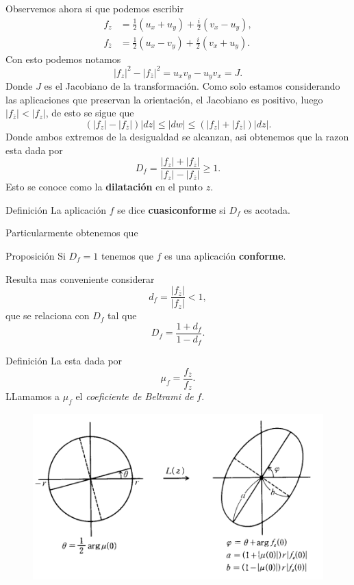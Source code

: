 \documentclass[xcolor=dvipsnames,10pt]{beamer}
\begin{document}
\begin{frame}
    Observemos ahora si que podemos escribir
    \begin{align*}
        f_z&=\frac{1}{2}(u_x+u_y)+\frac{i}{2}(v_x-u_y),\\
        f_{\overline{z}}&=\frac{1}{2}(u_x-v_y)+\frac{i}{2}(v_x+u_y).
    \end{align*}
    Con esto podemos notamos
    $$|f_z|^2-|f_{\overline{z}}|^2=u_xv_y-u_yv_x=J.$$
    Donde $J$ es el Jacobiano de la transformación. Como solo estamos considerando las aplicaciones que preservan la orientación, el Jacobiano es positivo, luego $|f_{\overline{z}}|<|f_z|$, de esto se sigue que
    $$(|f_z|-|f_{\overline{z}}|)|dz|\leq |dw|\leq (|f_z|+|f_{\overline{z}}|)|dz|.$$
    Donde ambos extremos de la desigualdad se alcanzan, asi obtenemos que la razon esta dada por
    $$D_f=\frac{|f_z|+|f_{\overline{z}}|}{|f_z|-|f_{\overline{z}}|}\geq 1.$$
    Esto se conoce como la \textbf{dilatación} en el punto $z$.
\end{frame}

\begin{frame}
    \begin{block}{Definición}
        La aplicación $f$ se dice \textbf{cuasiconforme} si $D_f$ es acotada.
        \end{block}
        Particularmente obtenemos que
\begin{block}{Proposición}
Si $D_f=1$ tenemos que $f$ es una aplicación \textbf{conforme}.
\end{block}
Resulta mas conveniente considerar
    $$d_f=\frac{|f_{\overline{z}}|}{|f_z|}<1,$$
    que se relaciona con $D_f$ tal que
    $$D_f=\frac{1+d_f}{1-d_f}.$$
\end{frame}
\begin{frame}
    \begin{block}{Definición}
        La  esta dada por
        $$\mu_f=\frac{f_{\overline{z}}}{f_z}.$$
        LLamamos a $\mu_f$ el \textit{coeficiente de Beltrami de }$f.$
    \end{block}
    \begin{figure}
            \centering
            \includegraphics[width=0.5\linewidth]{Imagenes/Semieje.png}
        \end{figure}
\end{frame}
\end{document}
